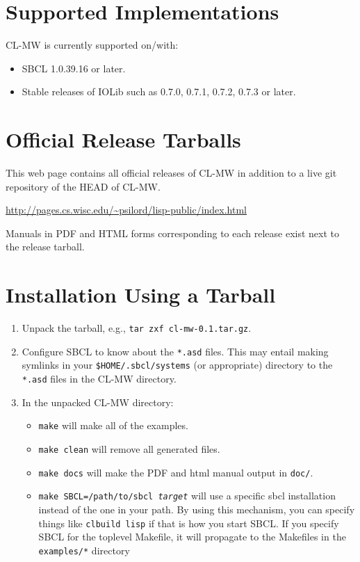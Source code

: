 \documentclass[titlepage,12pt]{book}
\newcommand{\xsmall}{\latexhtml{\small}{}}
\newcommand{\xnormalsize}{\latexhtml{\normalsize}{}}
\newcommand{\sbcl}{SBCL\xspace}
\newcommand{\clmw}{\xsmall\textsc{CL-MW}\xnormalsize\xspace}
\newcommand{\file}[1]{\texttt{#1}\xspace}
\newcommand{\cmd}[1]{\texttt{#1}\xspace}
\begin{document}
\section{Supported Implementations}

\clmw is currently supported on/with: 

\begin{itemize}
\item SBCL 1.0.39.16 or later.
\item Stable releases of IOLib such as 0.7.0, 0.7.1, 0.7.2, 0.7.3 or later.
\end{itemize}

\section{Official Release Tarballs}

This web page contains all official releases of \clmw in addition to 
a live git repository of the HEAD of \clmw.

\url{http://pages.cs.wisc.edu/~psilord/lisp-public/index.html}

Manuals in PDF and HTML forms corresponding to each release exist next to
the release tarball.

\section{Installation Using a Tarball}

\begin{enumerate}
\item Unpack the tarball, e.g., \cmd{tar zxf cl-mw-0.1.tar.gz}.
\item Configure SBCL to know about the \file{*.asd} files. This may 
	entail making symlinks in your \file{\$HOME/.sbcl/systems} (or appropriate)
	directory to the \file{*.asd} files in the \clmw directory.
\item In the unpacked \clmw directory:
	\begin{itemize}
	\item \cmd{make} will make all of the examples. 
	\item \cmd{make clean} will remove all generated files.
	\item \cmd{make docs} will make the PDF and html manual output in 
		\file{doc/}.
	\item \cmd{make SBCL=/path/to/sbcl \textit{target}} will use a specific
		sbcl installation instead of the one in your path. By using this 
		mechanism, you can specify things like \cmd{clbuild lisp} if 
		that is how you start \sbcl. If you specify SBCL for the toplevel 
		Makefile, it will propagate to the Makefiles in the 
		\file{examples/*} directory
	\end{itemize}
\end{enumerate}
\end{document}
